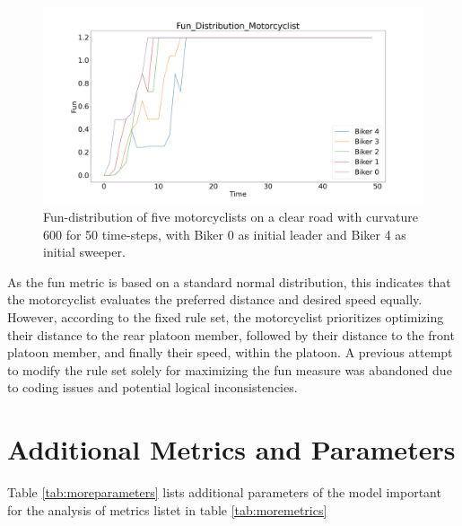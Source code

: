 \begin{figure}
    \centering
    \includegraphics[width=1.0\linewidth]{images/fun_distribution_free_road.png}
    \caption{Fun-distribution of five motorcyclists on a clear road with curvature 600 for 50 time-steps, with Biker 0 as initial leader and Biker 4 as initial sweeper.}
    \label{fig:fun_distribution_clear_road}
\end{figure}

As the fun metric is based on a standard normal distribution, this indicates that the motorcyclist evaluates the preferred distance and desired speed equally. However, according to the fixed rule set, the motorcyclist prioritizes optimizing their distance to the rear platoon member, followed by their distance to the front platoon member, and finally their speed, within the platoon. A previous attempt to modify the rule set solely for maximizing the fun measure was abandoned due to coding issues and potential logical inconsistencies.



\section{Additional Metrics and Parameters}
\label{sec:Additional Metrics and Parameters}
Table \ref{tab:moreparameters} lists additional parameters of the model important for the analysis of metrics listet in table \ref{tab:moremetrics}

